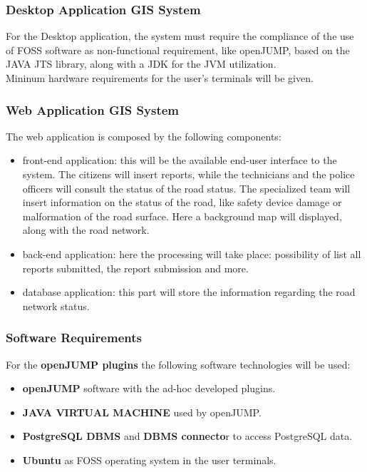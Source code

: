 \subsubsection{Desktop Application GIS System}
For the Desktop application, the system must require the compliance of the use of FOSS software as non-functional requirement, like openJUMP, based on the JAVA JTS library, along with a JDK for the JVM utilization. \\
Mininum hardware requirements for the user's terminals will be given.

\subsubsection{Web Application GIS System}
The web application is composed by the following components:
\begin{itemize}
    \item front-end application: this will be the available end-user interface to the system. The citizens will insert reports, while the technicians and the police officers will consult the status of the road status. The specialized team will insert information on the status of the road, like safety device damage or malformation of the road surface.
    Here a background map will displayed, along with the road network.
    \item back-end application: here the processing will take place: possibility of list all reports submitted, the report submission and more.
    \item database application: this part will store the information regarding the road network status.
\end{itemize}

\subsubsection{Software Requirements}
For the \textbf{openJUMP plugins} the following software technologies will be used:
\begin{itemize}
    \item \textbf{openJUMP} software with the ad-hoc developed plugins.
    \item \textbf{JAVA VIRTUAL MACHINE} used by openJUMP. 
    \item \textbf{PostgreSQL DBMS} and \textbf{DBMS connecto}r to access PostgreSQL data.
    \item \textbf{Ubuntu} as FOSS operating system in the user terminals. 
\end{itemize}

